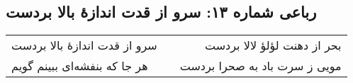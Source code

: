 \begin{center}
\section*{رباعی شماره ۱۳: سرو از قدت اندازهٔ بالا بردست}
\label{sec:013}
\begin{longtable}{l p{0.5cm} r}
سرو از قدت اندازهٔ بالا بردست
&&
بحر از دهنت لؤلؤ لالا بردست
\\
هر جا که بنفشه‌ای ببینم گویم
&&
مویی ز سرت باد به صحرا بردست
\\
\end{longtable}
\end{center}

